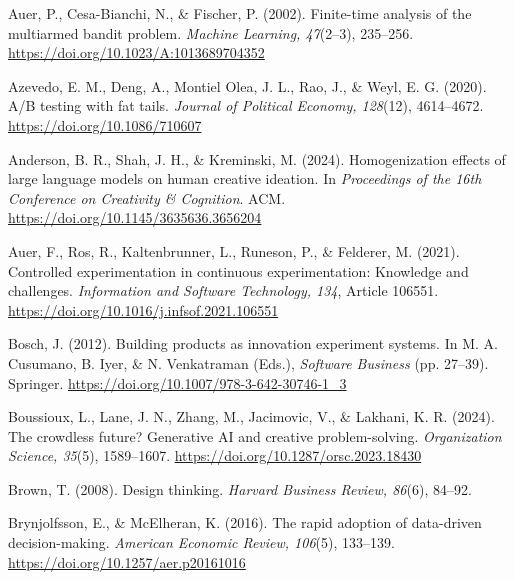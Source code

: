 \documentclass[preprint,12pt,authoryear]{elsarticle}
\newif\ifanon
\providecommand{\doi}[1]{\url{https://doi.org/#1}}
\theoremstyle{definition}
\begin{document}
\begin{thebibliography}{99}
\setlength{\itemsep}{1pt}

\ifanon
\bibitem[Anonymous(2026a)]{kuras2026} Anonymous. (2026a). \textit{Details withheld for double-blind review} (arXiv preprint).

\bibitem[Anonymous(2026b)]{dataset2026} [dataset] Anonymous. (2026b). \textit{Testbed code, experiment scripts and raw outputs} [Identifier withheld for double-blind review].
\fi


 Auer, P., Cesa-Bianchi, N., \& Fischer, P. (2002). Finite-time analysis of the multiarmed bandit problem. \textit{Machine Learning, 47}(2--3), 235--256. \doi{10.1023/A:1013689704352}

 Azevedo, E. M., Deng, A., Montiel Olea, J. L., Rao, J., \& Weyl, E. G. (2020). A/B testing with fat tails. \textit{Journal of Political Economy, 128}(12), 4614--4672. \doi{10.1086/710607}

 Anderson, B. R., Shah, J. H., \& Kreminski, M. (2024). Homogenization effects of large language models on human creative ideation. In \textit{Proceedings of the 16th Conference on Creativity \& Cognition}. ACM. \doi{10.1145/3635636.3656204}

 Auer, F., Ros, R., Kaltenbrunner, L., Runeson, P., \& Felderer, M. (2021). Controlled experimentation in continuous experimentation: Knowledge and challenges. \textit{Information and Software Technology, 134}, Article 106551. \doi{10.1016/j.infsof.2021.106551}

 Bosch, J. (2012). Building products as innovation experiment systems. In M. A. Cusumano, B. Iyer, \& N. Venkatraman (Eds.), \textit{Software Business} (pp. 27--39). Springer. \doi{10.1007/978-3-642-30746-1_3}

 Boussioux, L., Lane, J. N., Zhang, M., Jacimovic, V., \& Lakhani, K. R. (2024). The crowdless future? Generative AI and creative problem-solving. \textit{Organization Science, 35}(5), 1589--1607. \doi{10.1287/orsc.2023.18430}

 Brown, T. (2008). Design thinking. \textit{Harvard Business Review, 86}(6), 84--92.

 Brynjolfsson, E., \& McElheran, K. (2016). The rapid adoption of data-driven decision-making. \textit{American Economic Review, 106}(5), 133--139. \doi{10.1257/aer.p20161016}


\end{thebibliography}
\end{document}
